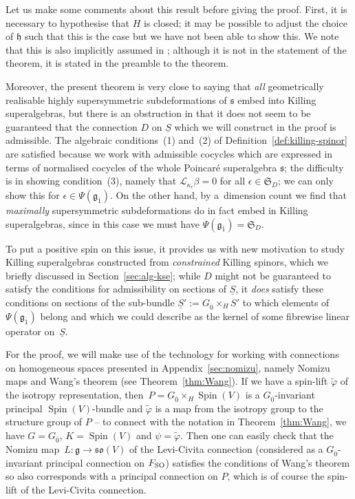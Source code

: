 \documentclass[10pt,a4paper]{amsart}
\numberwithin{equation}{section}
\newcommand{\fg}{\mathfrak{g}}
\newcommand{\fh}{\mathfrak{h}}
\newcommand{\fs}{\mathfrak{s}}
\newcommand{\fso}{\mathfrak{so}}
\newcommand{\fS}{\mathfrak{S}}
\newcommand{\eL}{\mathscr{L}}
\newcommand{\Sbundle}{\underline{S}}
\newcommand{\1}{\mathbbm{1}}
\DeclareMathOperator{\Spin}{Spin}
\begin{document}
\begin{Remark}
	Let us make some comments about this result before giving the proof. First, it is necessary to hypothesise that $H$ is closed; it may be possible to adjust the choice of $\fh$ such that this is the case but we have not been able to show this. We note that this is also implicitly assumed in \cite[Theorem~13]{Figueroa-OFarrill2017_1}; although it is not in the statement of the theorem, it is stated in the preamble to the theorem.
	
	Moreover, the present theorem is very close to saying that \emph{all} geometrically realisable highly supersymmetric subdeformations of $\fs$ embed into Killing superalgebras, but there is an obstruction in that it does not seem to be guaranteed that the connection $D$ on $\Sbundle$ which we will construct in the proof is admissible. The algebraic conditions~(1) and~(2) of Definition~\ref{def:killing-spinor} are satisfied because we work with admissible cocycles which are expressed in terms of normalised cocycles of the whole Poincar\'e superalgebra $\fs$; the difficulty is in showing condition~(3), namely that $\eL_{\kappa_\epsilon}\beta=0$ for all $\epsilon\in\fS_D$; we can only show this for $\epsilon\in\Psi(\fg_{\overline 1})$. On the other hand, by a~dimension count we find that \emph{maximally} supersymmetric subdeformations do in fact embed in Killing superalgebras, since in this case we must have $\Psi(\fg_{\overline 1})=\fS_D$.
	
	To put a positive spin on this issue, it provides us with new motivation to study Killing superalgebras constructed from \emph{constrained} Killing spinors, which we briefly discussed in Section~\ref{sec:alg-kse}; while $D$ might not be guaranteed to satisfy the conditions for admissibility on sections of $\Sbundle$, it \emph{does} satisfy these conditions on sections of the sub-bundle $\Sbundle':=G_{\overline0}\times_H S'$ to which elements of~$\Psi(\fg_{\overline 1})$ belong and which we could describe as the kernel of some fibrewise linear operator on~$\Sbundle$.
\end{Remark}

For the proof, we will make use of the technology for working with connections on homogeneous spaces presented in Appendix~\ref{sec:nomizu}, namely Nomizu maps and Wang's theorem (see Theorem~\ref{thm:Wang}). If we have a spin-lift $\tilde\varphi$ of the isotropy representation, then~${P=G_{\overline0}\times_H\Spin(V)}$ is a $G_{\overline0}$-invariant principal $\Spin(V)$-bundle and $\tilde\varphi$ is a map from the isotropy group to the structure group of $P$ -- to connect with the notation in Theorem~\ref{thm:Wang}, we have $G=G_{\overline 0}$, $K=\Spin(V)$ and $\psi=\tilde\varphi$. Then one can easily check that the Nomizu map~${L\colon \fg\to\fso(V)}$ of the Levi-Civita connection (considered as a $G_{\overline0}$-invariant principal connection on $F_{\rm SO}$) satisfies the conditions of Wang's theorem so also corresponds with a principal connection on $P$, which is of course the spin-lift of the Levi-Civita connection.
\end{document}

